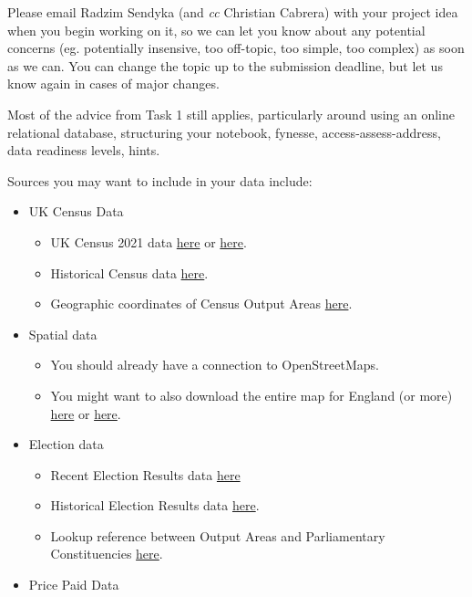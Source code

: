 \documentclass[11pt]{article}
\providecommand{\tightlist}{%
      \setlength{\itemsep}{0pt}\setlength{\parskip}{0pt}}
\begin{document}
Please email Radzim Sendyka (and \emph{cc} Christian Cabrera) with your
project idea when you begin working on it, so we can let you know about
any potential concerns (eg. potentially insensive, too off-topic, too
simple, too complex) as soon as we can. You can change the topic up to
the submission deadline, but let us know again in cases of major
changes.

    Most of the advice from Task 1 still applies, particularly around using
an online relational database, structuring your notebook, fynesse,
access-assess-address, data readiness levels, hints.

    Sources you may want to include in your data include:

\begin{itemize}
\tightlist
\item
  UK Census Data

  \begin{itemize}
  \tightlist
  \item
    UK Census 2021 data
    \href{https://www.ons.gov.uk/search?topics=9731,6646,3845,9497,4262,4128,7755,4994,6885,9724,7367&filter=datasets}{here}
    or \href{https://www.nomisweb.co.uk/sources/census_2021_bulk}{here}.
  \item
    Historical Census data
    \href{https://www.ons.gov.uk/census/historiccensusdata}{here}.
  \item
    Geographic coordinates of Census Output Areas
    \href{https://www.data.gov.uk/dataset/4d4e021d-fe98-4a0e-88e2-3ead84538537/output-areas-december-2021-boundaries-ew-bgc-v2}{here}.
  \end{itemize}
\item
  Spatial data

  \begin{itemize}
  \tightlist
  \item
    You should already have a connection to OpenStreetMaps.
  \item
    You might want to also download the entire map for England (or more)
    \href{https://download.openstreetmap.fr/extracts/}{here} or
    \href{https://wiki.openstreetmap.org/wiki/Planet.osm}{here}.
  \end{itemize}
\item
  Election data

  \begin{itemize}
  \tightlist
  \item
    Recent Election Results data
    \href{https://commonslibrary.parliament.uk/research-briefings/cbp-10009/}{here}
  \item
    Historical Election Results data
    \href{https://commonslibrary.parliament.uk/research-briefings/cbp-8647/\#fullreport}{here}.
  \item
    Lookup reference between Output Areas and Parliamentary
    Constituencies
    \href{https://geoportal.statistics.gov.uk/datasets/5968b5b2c0f14dd29ba277beaae6dec3_0/explore}{here}.
  \end{itemize}
\item
  Price Paid Data


\end{itemize}
\end{document}
